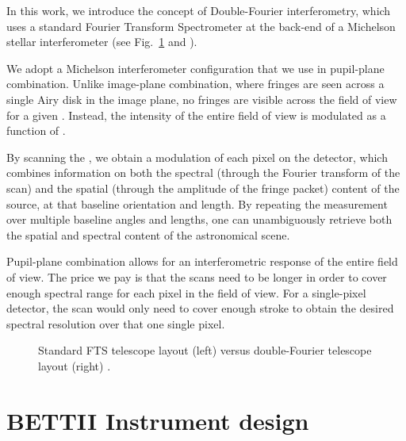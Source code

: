 In this work, we introduce the concept of Double-Fourier interferometry, which uses a standard Fourier Transform Spectrometer at the back-end of a Michelson stellar interferometer (see Fig.~\ref{fig:FTSvsDoubleFourier} and \citet{Mariotti:1988vea}). 


We adopt a Michelson interferometer configuration that we use in pupil-plane combination. Unlike image-plane combination, where fringes are seen across a single Airy disk in the image plane, no fringes are visible across the field of view for a given \OPD. Instead, the intensity of the entire field of view is modulated as a function of \OPD. 

By scanning the \OPD, we obtain a modulation of each pixel on the detector, which combines information on both the spectral (through the Fourier transform of the scan) and the spatial (through the amplitude of the fringe packet) content of the source, at that baseline orientation and length. By repeating the measurement over multiple baseline angles and lengths, one can unambiguously retrieve both the spatial and spectral content of the astronomical scene. 

Pupil-plane combination allows for an interferometric response of the entire field of view. The price we pay is that the \OPD scans need to be longer in order to cover enough spectral range for each pixel in the field of view. For a single-pixel detector, the \OPD scan would only need to cover enough stroke to obtain the desired spectral resolution over that one single pixel.

\begin{figure}[!ht]
	\centering
	
	\caption[FTS vs Double-Fourier]{Standard FTS telescope layout (left) versus double-Fourier telescope layout (right) \citep{Mariotti:1988vea}.}
	\label{fig:FTSvsDoubleFourier}
    \end{figure}



\section{BETTII Instrument design}

